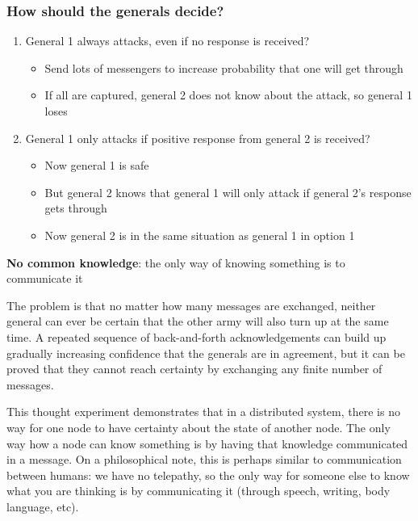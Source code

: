 \begin{frame}
    \label{s:two-generals-proto}
    \frametitle{How should the generals decide?}
    \begin{enumerate}
        \item General 1 always attacks, even if no response is received?
            \begin{itemize}
                \item Send lots of messengers to increase probability that one will get through
                \item If all are captured, general 2 does not know about the attack, so general 1 loses\\[1em]\pause
            \end{itemize}
        \item General 1 only attacks if positive response from general 2 is received?
            \begin{itemize}
                \item Now general 1 is safe
                \item But general 2 knows that general 1 will only attack if general 2's response gets through
                \item Now general 2 is in the same situation as general 1 in option 1\\[0.5em]\pause
            \end{itemize}
    \end{enumerate}
    \textbf{No common knowledge}: the only way of knowing something is to communicate it
\end{frame}

The problem is that no matter how many messages are exchanged, neither general can ever be certain that the other army will also turn up at the same time.
A repeated sequence of back-and-forth acknowledgements can build up gradually increasing confidence that the generals are in agreement, but it can be proved that they cannot reach certainty by exchanging any finite number of messages.

This thought experiment demonstrates that in a distributed system, there is no way for one node to have certainty about the state of another node.
The only way how a node can know something is by having that knowledge communicated in a message.
On a philosophical note, this is perhaps similar to communication between humans: we have no telepathy, so the only way for someone else to know what you are thinking is by communicating it (through speech, writing, body language, etc).

